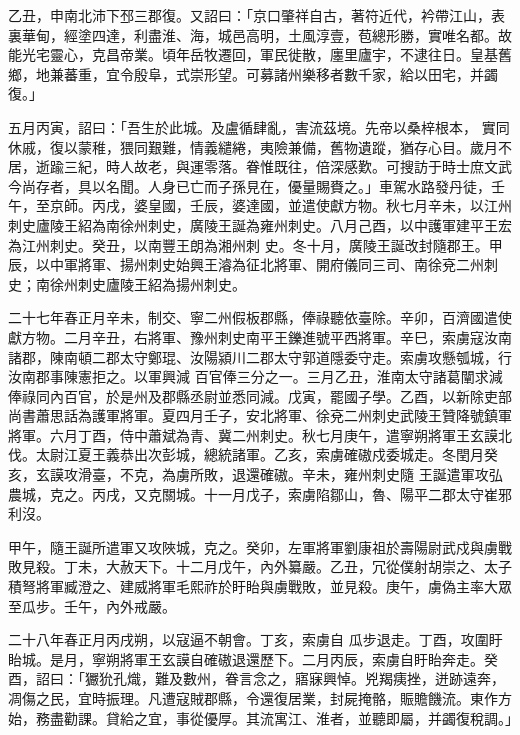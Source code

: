 \begin{pinyinscope}
 乙丑，申南北沛下邳三郡復。又詔曰：「京口肇祥自古，著符近代，衿帶江山，表裏華甸，經塗四達，利盡淮、海，城邑高明，土風淳壹，苞總形勝，實唯名都。故能光宅靈心，克昌帝業。頃年岳牧遷回，軍民徙散，廛里廬宇，不逮往日。皇基舊鄉，地兼蕃重，宜令殷阜，式崇形望。可募諸州樂移者數千家，給以田宅，并蠲復。」



 五月丙寅，詔曰：「吾生於此城。及盧循肆亂，害流茲境。先帝以桑梓根本，
 實同休戚，復以蒙稚，猥同艱難，情義繾綣，夷險兼備，舊物遺蹤，猶存心目。歲月不居，逝踰三紀，時人故老，與運零落。眷惟既往，倍深感歎。可搜訪于時士庶文武今尚存者，具以名聞。人身已亡而子孫見在，優量賜賚之。」車駕水路發丹徒，壬午，至京師。丙戌，婆皇國，壬辰，婆達國，並遣使獻方物。秋七月辛未，以江州刺史廬陵王紹為南徐州刺史，廣陵王誕為雍州刺史。八月己酉，以中護軍建平王宏為江州刺史。癸丑，以南豐王朗為湘州刺
 史。冬十月，廣陵王誕改封隨郡王。甲辰，以中軍將軍、揚州刺史始興王濬為征北將軍、開府儀同三司、南徐兗二州刺史；南徐州刺史廬陵王紹為揚州刺史。



 二十七年春正月辛未，制交、寧二州假板郡縣，俸祿聽依臺除。辛卯，百濟國遣使獻方物。二月辛丑，右將軍、豫州刺史南平王鑠進號平西將軍。辛巳，索虜寇汝南諸郡，陳南頓二郡太守鄭琨、汝陽潁川二郡太守郭道隱委守走。索虜攻懸瓠城，行汝南郡事陳憲拒之。以軍興減
 百官俸三分之一。三月乙丑，淮南太守諸葛闡求減俸祿同內百官，於是州及郡縣丞尉並悉同減。戊寅，罷國子學。乙酉，以新除吏部尚書蕭思話為護軍將軍。夏四月壬子，安北將軍、徐兗二州刺史武陵王贊降號鎮軍將軍。六月丁酉，侍中蕭斌為青、冀二州刺史。秋七月庚午，遣寧朔將軍王玄謨北伐。太尉江夏王義恭出次彭城，總統諸軍。乙亥，索虜確磝戍委城走。冬閏月癸亥，玄謨攻滑臺，不克，為虜所敗，退還確磝。辛未，雍州刺史隨
 王誕遣軍攻弘農城，克之。丙戌，又克關城。十一月戊子，索虜陷鄒山，魯、陽平二郡太守崔邪利沒。



 甲午，隨王誕所遣軍又攻陜城，克之。癸卯，左軍將軍劉康祖於壽陽尉武戍與虜戰敗見殺。丁未，大赦天下。十二月戊午，內外纂嚴。乙丑，冗從僕射胡崇之、太子積弩將軍臧澄之、建威將軍毛熙祚於盱眙與虜戰敗，並見殺。庚午，虜偽主率大眾至瓜步。壬午，內外戒嚴。



 二十八年春正月丙戌朔，以寇逼不朝會。丁亥，索虜自
 瓜步退走。丁酉，攻圍盱眙城。是月，寧朔將軍王玄謨自確磝退還歷下。二月丙辰，索虜自盱眙奔走。癸酉，詔曰：「玁狁孔熾，難及數州，眷言念之，寤寐興悼。兇羯痍挫，迸跡遠奔，凋傷之民，宜時振理。凡遭寇賊郡縣，令還復居業，封屍掩骼，賑贍饑流。東作方始，務盡勸課。貸給之宜，事從優厚。其流寓江、淮者，並聽即屬，并蠲復稅調。」




\end{pinyinscope}
